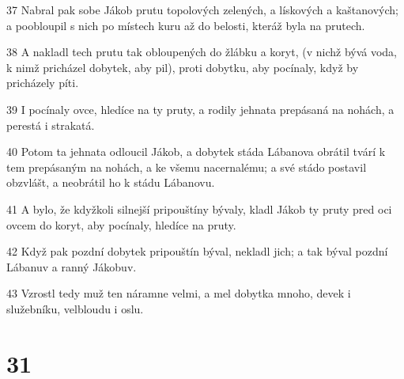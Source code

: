 \par 37 Nabral pak sobe Jákob prutu topolových zelených, a lískových a kaštanových; a poobloupil s nich po místech kuru až do belosti, kteráž byla na prutech.
\par 38 A nakladl tech prutu tak obloupených do žlábku a koryt, (v nichž bývá voda, k nimž pricházel dobytek, aby pil), proti dobytku, aby pocínaly, když by pricházely píti.
\par 39 I pocínaly ovce, hledíce na ty pruty, a rodily jehnata prepásaná na nohách, a perestá i strakatá.
\par 40 Potom ta jehnata odloucil Jákob, a dobytek stáda Lábanova obrátil tvárí k tem prepásaným na nohách, a ke všemu nacernalému; a své stádo postavil obzvlášt, a neobrátil ho k stádu Lábanovu.
\par 41 A bylo, že kdyžkoli silnejší pripouštíny bývaly, kladl Jákob ty pruty pred oci ovcem do koryt, aby pocínaly, hledíce na pruty.
\par 42 Když pak pozdní dobytek pripouštín býval, nekladl jich; a tak býval pozdní Lábanuv a ranný Jákobuv.
\par 43 Vzrostl tedy muž ten náramne velmi, a mel dobytka mnoho, devek i služebníku, velbloudu i oslu.

\chapter{31}

